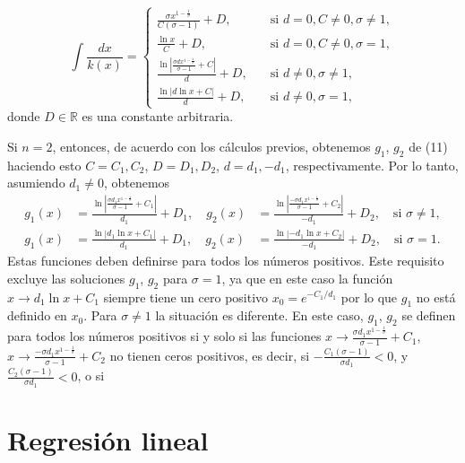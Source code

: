 \documentclass[a4paper,fleqn]{cas-dc}
\begin{document}
\begin{equation}
\int\frac{dx}{k\left(x\right)}=
\begin{cases}
\frac{\sigma x^{1-\frac{1}{\sigma}}}{C\left(\sigma-1\right)}+D,\quad&\text{si }d=0,C\neq0,\sigma\neq1,\\
\frac{\ln x}{C}+D,\quad&\text{si }d=0,C\neq0,\sigma=1,\\
\frac{\ln\left|\frac{\sigma dx^{1-\frac{1}{\sigma}}}{\sigma-1}+C\right|}{d}+D,\quad&\text{si }d\neq0,\sigma\neq1,\\
\frac{\ln\left|d\ln x+C\right|}{d}+D,\quad&\text{si }d\neq0,\sigma=1,
\end{cases}
\end{equation}
donde $D\in\mathds{R}$ es una constante arbitraria.

Si $n=2$, entonces, de acuerdo con los cálculos previos, obtenemos $g_{1}$, $g_{2}$ de (11) haciendo esto $C=C_{1},C_{2}$, $D=D_{1},D_{2}$, $d=d_{1},-d_{1}$, respectivamente. Por lo tanto, asumiendo $d_{1}\neq0$, obtenemos
\begin{align*}
g_{1}\left(x\right)
&=\frac{\ln\left|\frac{\sigma d_{1}x^{1-\frac{1}{\sigma}}}{\sigma-1}+C_{1}\right|}{d_{1}}+D_{1},\quad
g_{2}\left(x\right)
&=\frac{\ln\left|\frac{-\sigma d_{1}x^{1-\frac{1}{\sigma}}}{\sigma-1}+C_{2}\right|}{-d_{1}}+D_{2},\quad\text{si }\sigma\neq1,\\
g_{1}\left(x\right)
&=\frac{\ln\left|d_{1}\ln x+C_{1}\right|}{d_{1}}+D_{1},\quad
g_{2}\left(x\right)
&=\frac{\ln\left|-d_{1}\ln x+C_{2}\right|}{-d_{1}}+D_{2},\quad\text{si }\sigma=1.
\end{align*}
Estas funciones deben definirse para todos los números positivos. Este requisito excluye las soluciones $g_{1}$, $g_{2}$ para $\sigma=1$, ya que en este caso la función $x\rightarrow d_{1}\ln x+C_{1}$ siempre tiene un cero positivo $x_{0}=e^{-C_{1}/d_{1}}$ por lo que $g_{1}$ no está definido en $x_{0}$. Para $\sigma\neq1$ la situación es diferente. En este caso, $g_{1}$, $g_{2}$ se definen para todos los números positivos si y solo si las funciones $x\rightarrow\frac{\sigma d_{1}x^{1-\frac{1}{\sigma}}}{\sigma-1}+C_{1}$, $x\rightarrow\frac{-\sigma d_{1}x^{1-\frac{1}{\sigma}}}{\sigma-1}+C_{2}$ no tienen ceros positivos, es decir, si $-\frac{C_{1}\left(\sigma-1\right)}{\sigma d_{1}}<0$, y $\frac{C_{2}\left(\sigma-1\right)}{\sigma d_{1}}<0$, o si
\section{Regresión lineal}
\end{document}
